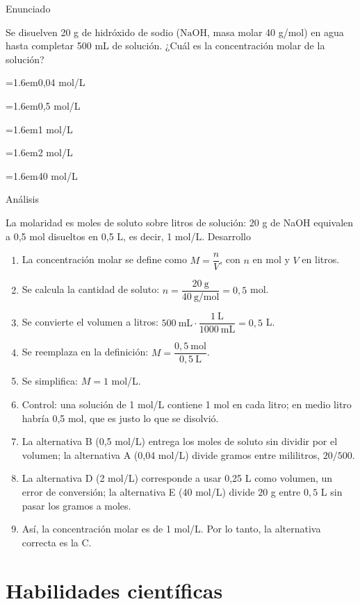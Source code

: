 \documentclass[10pt,a4paper,twocolumn]{article}
\newcommand{\alternativa}[2]{\par\noindent\hangindent=1.6em\hangafter=1\makebox[1.6em][l]{\tecla{#1}}#2\par}
\newcommand{\clave}[1]{\par\smallskip{\sffamily\footnotesize\color{esmeralda} Clave \teclaok{#1}}\par}
\begin{document}
\begin{ejemplo}
{\sffamily\footnotesize\color{zinc500} Enunciado}\par
Se disuelven 20 g de hidróxido de sodio ($\mathrm{NaOH}$, masa molar 40 g/mol) en agua hasta completar 500 mL de solución. ¿Cuál es la concentración molar de la solución?
\alternativa{A}{0,04 mol/L}
\alternativa{B}{0,5 mol/L}
\alternativa{C}{1 mol/L}
\alternativa{D}{2 mol/L}
\alternativa{E}{40 mol/L}
\clave{C}
{\sffamily\footnotesize\color{zinc500} Análisis}\par La molaridad es moles de soluto sobre litros de solución: 20 g de NaOH equivalen a 0,5 mol disueltos en 0,5 L, es decir, 1 mol/L.
{\sffamily\footnotesize\color{zinc500} Desarrollo}
\begin{enumerate}
  \item La concentración molar se define como $M = \dfrac{n}{V}$, con $n$ en mol y $V$ en litros.
  \item Se calcula la cantidad de soluto: $n = \dfrac{20\ \text{g}}{40\ \text{g/mol}} = 0{,}5$ mol.
  \item Se convierte el volumen a litros: $500\ \text{mL}\cdot \dfrac{1\ \text{L}}{1000\ \text{mL}} = 0{,}5$ L.
  \item Se reemplaza en la definición: $M = \dfrac{0{,}5\ \text{mol}}{0{,}5\ \text{L}}$.
  \item Se simplifica: $M = 1$ mol/L.
  \item Control: una solución de 1 mol/L contiene 1 mol en cada litro; en medio litro habría 0,5 mol, que es justo lo que se disolvió.
  \item La alternativa B (0,5 mol/L) entrega los moles de soluto sin dividir por el volumen; la alternativa A (0,04 mol/L) divide gramos entre mililitros, $20/500$.
  \item La alternativa D (2 mol/L) corresponde a usar 0,25 L como volumen, un error de conversión; la alternativa E (40 mol/L) divide $20$ g entre $0{,}5$ L sin pasar los gramos a moles.
  \item Así, la concentración molar es de 1 mol/L. Por lo tanto, la alternativa correcta es la C.
\end{enumerate}
\end{ejemplo}

\section{Habilidades científicas}
\end{document}
